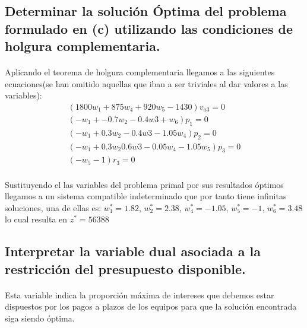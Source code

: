 \documentclass[10pt, a4paper]{article}
\begin{document}
		\subsection{Determinar la solución Óptima del problema formulado en (c) utilizando las condiciones de holgura complementaria.}

			\paragraph{}
			Aplicando el teorema de holgura complementaria llegamos a las siguientes ecuaciones(se han omitido aquellas que iban a ser triviales al dar valores a las variables):
			\[
			\begin{split}
				(1800w_{1} + 875w_{4} + 920w_{5} - 1430)v_{a3} = 0 \\
				(-w_{1} + -0.7w_{2} -0.4w{3} +w_{6})p_{1} = 0 \\
				(-w_{1} + 0.3w_{2} -0.4w{3} -1.05w_{4})p_{2} = 0 \\
				(-w_{1} + 0.3w_{2} 0.6w{3} -0.05w_{4} -1.05w_{5})p_{3} = 0 \\
				(-w_{5} - 1)r_{3} = 0 \\
			\end{split}
			\]

			Sustituyendo el las variables del problema primal por sus resultados óptimos llegamos a un sistema compatible indeterminado que por tanto tiene infinitas soluciones, una de ellas es: \(w_{1}^{*} = 1.82 \), \(w_{2}^{*} = 2.38 \), \(w_{4}^{*} = -1.05 \), \(w_{5}^{*} = -1 \), \(w_{6}^{*} = 3.48 \)lo cual resulta en \(z^{*} = 56388\)


		\subsection{Interpretar la variable dual asociada a la restricción del presupuesto disponible.}

			\paragraph{}
			Esta variable indica la proporción máxima de intereses que debemos estar dispuestos por los pagos a plazos de los equipos para que la solución encontrada siga siendo óptima.
\end{document}
